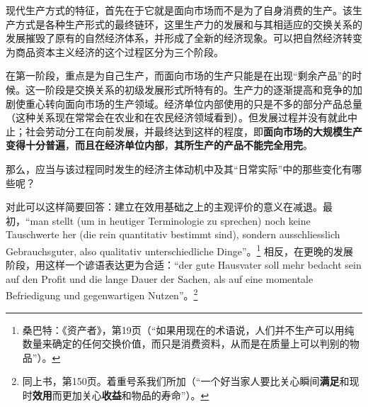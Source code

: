 \documentclass[fontset=fandol, a4paper, 12pt, openright]{ctexbook}
\begin{document}
现代生产方式的特征，首先在于它就是面向市场而不是为了自身消费的生产。该生产方式是各种生产形式的最终链环，这里生产力的发展和与其相适应的交换关系的发展摧毁了原有的自然经济体系，并形成了全新的经济现象。可以把自然经济转变为商品资本主义经济的这个过程区分为三个阶段。

在第一阶段，重点是为自己生产，而面向市场的生产只能是在出现“剩余产品”的时候。这一阶段是交换关系的初级发展形式所特有的。生产力的逐渐提高和竞争的加剧使重心转向面向市场的生产领域。经济单位内部使用的只是不多的部分产品总量（这种关系现在常常会在农业和在农民经济领域看到）。但发展过程并没有就此中止；社会劳动分工在向前发展，并最终达到这样的程度，即\textbf{面向市场的大规模生产变得十分普遍}，\textbf{而且在经济单位内部}，\textbf{其所生产的产品不能完全用完}。

那么，应当与该过程同时发生的经济主体动机中及其“日常实际”中的那些变化有哪些呢？

对此可以这样简要回答：建立在效用基础之上的主观评价的意义在减退。最初，“man stellt (um in heutiger Terminologie zu sprechen) noch keine Tauschwerte her (die rein quantitativ bestimmt sind), sondern ausschliesslich Gebrauchsguter, also qualitativ unterschiedliche Dinge”。\footnote{桑巴特：《资产者》，第19页（“如果用现在的术语说，人们并不生产可以用纯数量来确定的任何交换价值，而只是消费资料，从而是在质量上可以判别的物品”）。} 相反，在更晚的发展阶段，用这样一个谚语表达更为合适：“der gute Hausvater soll mehr bedacht sein auf den Profit und die lange Dauer der Sachen, als auf eine momentale Befriedigung und gegenwartigen Nutzen”。\footnote{同上书，第150页。着重号系我们所加（“一个好当家人要比关心瞬间\textbf{满足}和现时\textbf{效用}而更加关心\textbf{收益}和物品的寿命”）。}
\end{document}
